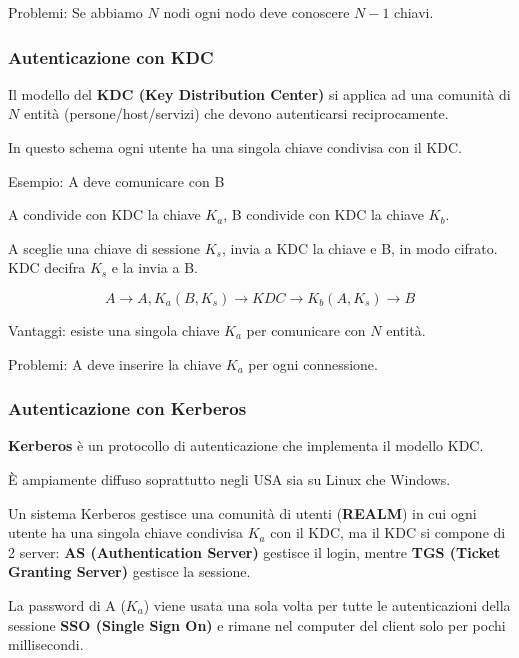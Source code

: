             Problemi: Se abbiamo $N$ nodi ogni nodo deve conoscere $N - 1$ chiavi.
        
        \subsubsection{Autenticazione con KDC}
            Il modello del \textbf{KDC (Key Distribution Center)} si applica ad una comunità di $N$ entità (persone/host/servizi) che devono autenticarsi reciprocamente.
        
            In questo schema ogni utente ha una singola chiave condivisa con il KDC.
        
            Esempio: A deve comunicare con B
        
            A condivide con KDC la chiave $K_a$, B condivide con KDC la chiave $K_b$.
        
            A sceglie una chiave di sessione $K_s$, invia a KDC la chiave e B, in modo cifrato. KDC decifra $K_s$ e la invia a B.
        
            \begin{equation*}
                A \rightarrow A, K_a(B,K_s) \rightarrow KDC \rightarrow K_b(A,K_s) \rightarrow B
            \end{equation*}
        
            Vantaggi: esiste una singola chiave $K_a$ per comunicare con $N$ entità.
        
            Problemi: A deve inserire la chiave $K_a$ per ogni connessione.

        \subsubsection{Autenticazione con Kerberos}
            \textbf{Kerberos} è un protocollo di autenticazione che implementa il modello KDC.

            È ampiamente diffuso soprattutto negli USA sia su Linux che Windows.

            Un sistema Kerberos gestisce una comunità di utenti (\textbf{REALM}) in cui ogni utente ha una singola chiave condivisa $K_a$ con il KDC, ma il KDC si compone di 2 server: \textbf{AS (Authentication Server)} gestisce il login, mentre \textbf{TGS (Ticket Granting Server)} gestisce la sessione.

            La password di A ($K_a$) viene usata una sola volta per tutte le autenticazioni della sessione \textbf{SSO (Single Sign On)} e rimane nel computer del client solo per pochi millisecondi.

